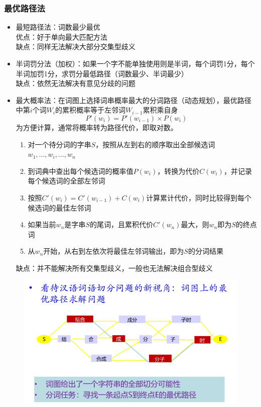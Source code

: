 \subsubsection{最优路径法}
\begin{itemize}
\item 最短路径法：词数最少最优\\
优点：好于单向最大匹配方法\\
缺点：同样无法解决大部分交集型歧义
\item 半词罚分法（加权）：如果一个字不能单独使用则是半词，每个词罚1分，每个半词加罚1分，求罚分最低路径（词数最少、半词最少）\\
缺点：依然无法解决有意见分歧的问题
\item 最大概率法：在词图上选择词串概率最大的分词路径（动态规划），最优路径中第$i$个词$W_i$的累积概率等于左邻词$W_{i-1}$累积乘自身
\[P'(w_i)=P'(w_{i-1})\times P(w_i)\]
为方便计算，通常将概率转为路径代价，即取对数。
\begin{enumerate}
	\item 对一个待分词的字串$S$，按照从左到右的顺序取出全部候选词$w_1,\ldots,w_i,\ldots,w_n$
	\item 到词典中查出每个候选词的概率值$P(w_i)$，转换为代价$C(w_i)$，并记录每个候选词的全部左邻词
	\item 按照$C'(w_i)=C'(w_{i-1})+C(w_i)$计算累计代价，同时比较得到每个候选词的最佳左邻词
	\item 如果当前$w_n$是字串$S$的尾词，且累积代价$C'(w_n)$最大，则$w_n$即为$S$的终点词
	\item 从$w_n$开始，从右到左依次将最佳左邻词输出，即为$S$的分词结果
\end{enumerate}
缺点：并不能解决所有交集型歧义，一般也无法解决组合型歧义
\end{itemize}
\begin{figure}[H]
\centering
\includegraphics[width=0.6\linewidth]{fig/best_path.png}
\end{figure}

